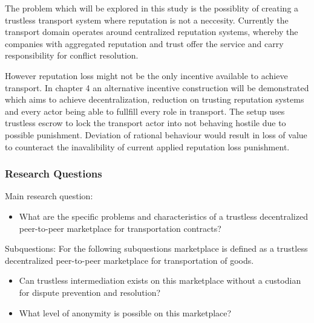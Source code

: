 The problem which will be explored in this study is the possiblity of creating a trustless transport system where reputation is not a neccesity. Currently the transport domain operates around centralized reputation systems, whereby the companies with aggregated reputation and trust offer the service and carry responsibility for conflict resolution.\par
However reputation loss might not be the only incentive available to achieve transport. In chapter 4 an alternative incentive construction will be demonstrated which aims to achieve decentralization, reduction on trusting reputation systems and every actor being able to fullfill every role in transport. The setup uses trustless escrow to lock the transport actor into not behaving hostile due to possible punishment. Deviation of rational behaviour would result in loss of value to counteract the inavalibility of current applied reputation loss punishment.

\subsubsection{Research Questions}

\bigbreak
\noindent Main research question:
\begin{itemize}
  \item What are the specific problems and characteristics of a trustless decentralized peer-to-peer marketplace for transportation contracts?
\end{itemize}
\bigbreak
\noindent Subquestions:
\bigbreak
\noindent For the following subquestions marketplace is defined as a trustless decentralized peer-to-peer marketplace for transportation of goods.
\begin{itemize}
  \item Can trustless intermediation exists on this marketplace without a custodian for dispute prevention and resolution?
  \item What level of anonymity is possible on this marketplace?
\end{itemize}


